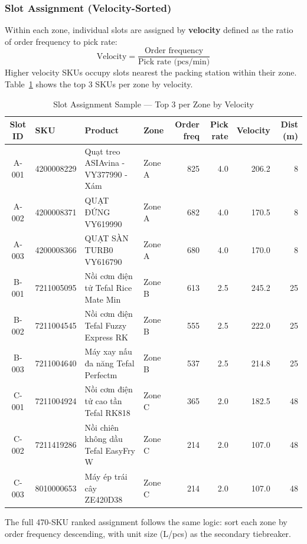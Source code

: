 \documentclass[11pt]{article}
\begin{document}
\subsubsection{Slot Assignment (Velocity-Sorted)}\label{slot-assignment}

Within each zone, individual slots are assigned by \textbf{velocity}
defined as the ratio of order frequency to pick rate:
\[
\text{Velocity} = \frac{\text{Order frequency}}{\text{Pick rate (pcs/min)}}
\]
Higher velocity SKUs occupy slots nearest the packing station within their zone.
Table~\ref{tab:slot-assignment} shows the top 3 SKUs per zone by velocity.

\begin{table}[H]
\centering
\caption{Slot Assignment Sample --- Top 3 per Zone by Velocity}
\label{tab:slot-assignment}
\small
\begin{tabular}{c l >{\raggedright\arraybackslash}p{3.2cm} l r r r r}
\toprule
Slot ID & SKU & Product & Zone & Order freq & Pick rate & Velocity & Dist (m) \\
\midrule
        A-001 & 4200008229 & Quạt treo ASIAvina - VY377990 - Xám & Zone A & 825 & 4.0 & 206.2 & 8 \\
        A-002 & 4200008371 & QUẠT ĐỨNG VY619990 & Zone A & 682 & 4.0 & 170.5 & 8 \\
        A-003 & 4200008366 & QUẠT SÀN TURB0 VY616790 & Zone A & 680 & 4.0 & 170.0 & 8 \\
        B-001 & 7211005095 & Nồi cơm điện tử Tefal Rice Mate Min & Zone B & 613 & 2.5 & 245.2 & 25 \\
        B-002 & 7211004545 & Nồi cơm điện Tefal Fuzzy Express RK & Zone B & 555 & 2.5 & 222.0 & 25 \\
        B-003 & 7211004640 & Máy xay nấu đa năng  Tefal Perfectm & Zone B & 537 & 2.5 & 214.8 & 25 \\
        C-001 & 7211004924 & Nồi cơm điện tử cao tần Tefal RK818 & Zone C & 365 & 2.0 & 182.5 & 48 \\
        C-002 & 7211419286 & Nồi chiên không dầu Tefal EasyFry W & Zone C & 214 & 2.0 & 107.0 & 48 \\
        C-003 & 8010000653 & Máy ép trái cây ZE420D38 & Zone C & 214 & 2.0 & 107.0 & 48 \\
\bottomrule
\end{tabular}
\end{table}

The full 470-SKU ranked assignment follows the same logic: sort each zone by order frequency descending,
with unit size (L/pcs) as the secondary tiebreaker.
\end{document}
